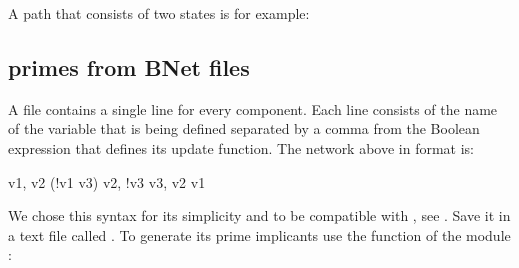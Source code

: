\documentclass[letterpaper,10pt,english]{sphinxmanual}
\begin{document}
A path that consists of two states is for example:

\begin{sphinxVerbatim}[commandchars=\\\{\}]
  
  
  \PYG{p}{[}\PYG{p}{]}
\end{sphinxVerbatim}


\subsection{primes from BNet files}
\label{\detokenize{Manual:primes-from-bnet-files}}\label{\detokenize{Manual:id1}}
A  file contains a single line for every component.
Each line consists of the name of the variable that is being defined separated by a comma from the Boolean expression that defines its update function.
The network above in  format is:

\begin{sphinxVerbatim}[commandchars=\\\{\}]
v1,   v2 \PYGZam{} (!v1 \textbar{} v3)
v2,   !v3
v3,   v2 \textbar{} v1
\end{sphinxVerbatim}

We chose this syntax for its simplicity and to be compatible with , see {\hyperref[\detokenize{Bibliography:mussel2010}]{}}.
Save it in a text file called .
To generate its prime implicants use the function {\hyperref[\detokenize{FileExchange:bnet2primes}]{}} of the module {\hyperref[\detokenize{FileExchange:fileexchange}]{}}:
\end{document}
